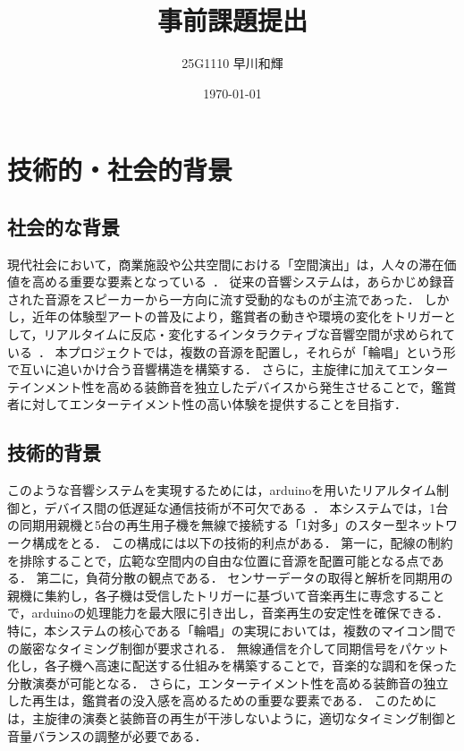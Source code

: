 \documentclass[uplatex,dvipdfmx]{jlreq}
\begin{document}
\title{事前課題提出}
\author{25G1110 早川和輝}
\date{\today}
\maketitle
\section{技術的・社会的背景}
\subsection{社会的な背景}
現代社会において，商業施設や公共空間における「空間演出」は，人々の滞在価値を高める重要な要素となっている~\cite{110}．
従来の音響システムは，あらかじめ録音された音源をスピーカーから一方向に流す受動的なものが主流であった．
しかし，近年の体験型アートの普及により，鑑賞者の動きや環境の変化をトリガーとして，リアルタイムに反応・変化するインタラクティブな音響空間が求められている~\cite{110}．
本プロジェクトでは，複数の音源を配置し，それらが「輪唱」という形で互いに追いかけ合う音響構造を構築する．
さらに，主旋律に加えてエンターテインメント性を高める装飾音を独立したデバイスから発生させることで，鑑賞者に対してエンターテイメント性の高い体験を提供することを目指す．

\subsection{技術的背景}
このような音響システムを実現するためには，arduinoを用いたリアルタイム制御と，デバイス間の低遅延な通信技術が不可欠である~\cite{mitubishi}．
本システムでは，1台の同期用親機と5台の再生用子機を無線で接続する「1対多」のスター型ネットワーク構成をとる．
この構成には以下の技術的利点がある．
第一に，配線の制約を排除することで，広範な空間内の自由な位置に音源を配置可能となる点である．
第二に，負荷分散の観点である．
センサーデータの取得と解析を同期用の親機に集約し，各子機は受信したトリガーに基づいて音楽再生に専念することで，arduinoの処理能力を最大限に引き出し，音楽再生の安定性を確保できる．
特に，本システムの核心である「輪唱」の実現においては，複数のマイコン間での厳密なタイミング制御が要求される．
無線通信を介して同期信号をパケット化し，各子機へ高速に配送する仕組みを構築することで，音楽的な調和を保った分散演奏が可能となる．
さらに，エンターテイメント性を高める装飾音の独立した再生は，鑑賞者の没入感を高めるための重要な要素である．
このためには，主旋律の演奏と装飾音の再生が干渉しないように，適切なタイミング制御と音量バランスの調整が必要である．
\end{document}
